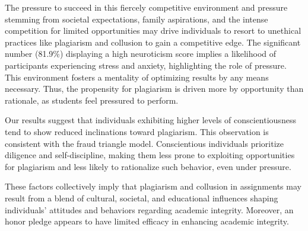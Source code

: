 The pressure to succeed in this fiercely competitive environment and pressure stemming from societal expectations, family aspirations, and the intense competition for limited opportunities may drive individuals to resort to unethical practices like plagiarism and collusion to gain a competitive edge. The significant number (81.9\%) displaying a high neuroticism score implies a likelihood of participants experiencing stress and anxiety, highlighting the role of pressure. This environment fosters a mentality of optimizing results by any means necessary. Thus, the propensity for plagiarism is driven more by opportunity than rationale, as students feel pressured to perform. 

Our results suggest that individuals exhibiting higher levels of conscientiousness tend to show reduced inclinations toward plagiarism. This observation is consistent with the fraud triangle model. Conscientious individuals prioritize diligence and self-discipline, making them less prone to exploiting opportunities for plagiarism and less likely to rationalize such behavior, even under pressure.

These factors collectively imply that plagiarism and collusion in assignments may result from a blend of cultural, societal, and educational influences shaping individuals' attitudes and behaviors regarding academic integrity. Moreover, an honor pledge appears to have limited efficacy in enhancing academic integrity.
\vspace{-4pt}